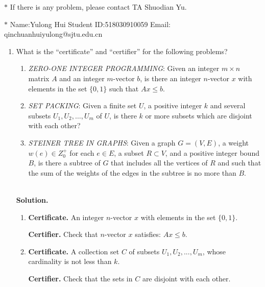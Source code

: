 \documentclass[12pt,a4paper]{article}
\theoremstyle{definition}
\begin{document}
\noindent

\noindent{}
\begin{center}
\footnotesize{\color{red}$*$ If there is any problem, please contact TA Shuodian Yu. }

\footnotesize{\color{blue}$*$ Name:Yulong Hui  \quad Student ID:518030910059 \quad Email: qinchuanhuiyulong@sjtu.edu.cn}
\end{center}
\begin{enumerate}
	\item What is the ``certificate'' and ``certifier'' for the following problems?
	\begin{enumerate}
		\item \emph{ZERO-ONE INTEGER PROGRAMMING}: Given an integer $m \times n$ matrix $A$ and an integer $m$-vector $b$, is there an integer $n$-vector $x$ with elements in the set $\{0, 1\}$ such that $Ax \leq b$.
		\item \emph{SET PACKING}: Given a finite set $U$, a positive integer $k$ and several subsets $U_1, U_2, \ldots, U_m$ of $U$, is there $k$ or more subsets which are disjoint with each other?
		\item \emph{STEINER TREE IN GRAPHS}: Given a graph $G=(V,E)$, a weight $w(e)\in Z_0^{+}$ for each $e\in E$, a subset $R \subset V$, and a positive integer bound $B$, is there a subtree of $G$ that includes all the vertices of $R$ and such that the sum of the weights of the edges in the subtree is no more than $B$.
	\end{enumerate}
	 
	 ~\\
	 \textbf{Solution.}
	 \begin{enumerate}
	 	\item 
	 	\textbf{Certificate.} An integer $n$-vector $x$ with elements in the set $\{0,1\}$.
	 	
	 	\textbf{Certifier.} Check that $n$-vector $x$ satisfies: $Ax \leq b$.

	 
		
		\item
		\textbf{Certificate.} A collection  set $C$ of subsets $U_1,U_2,...,U_m$, whose cardinality is not less than $k$.
		
		\textbf{Certifier.} Check that the sets in  $C$ are disjoint with each other.
		

\end{enumerate}
\end{enumerate}
\end{document}
